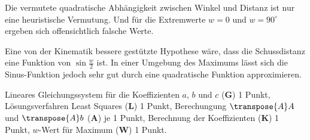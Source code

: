 \begin{diskussion}
Die vermutete quadratische Abhängigkeit zwischen Winkel und Distanz
ist nur eine heuristische Vermutung.
Und für die Extremwerte $w=0$ und $w=90^\circ$ ergeben sich offensichtlich
falsche Werte.

Eine von der Kinematik bessere gestützte Hypothese wäre, dass
die Schussdistanz eine Funktion von $\sin \frac{w}2$ ist.
In einer Umgebung des Maximums lässt sich die Sinus-Funktion jedoch
sehr gut durch eine quadratische Funktion approximieren.
\end{diskussion}

\begin{bewertung}
Lineares Gleichungssystem für die Koeffizienten $a$, $b$ und $c$ ({\bf G})
1 Punkt,
Lösungsverfahren Least Squares ({\bf L}) 1 Punkt,
Berechungung $\transpose{A}A$ und $\transpose{A}b$ ({\bf A}) je 1 Punkt,
Berechnung der Koeffizienten ({\bf K}) 1 Punkt,
$w$-Wert für Maximum ({\bf W}) 1 Punkt.
\end{bewertung}

